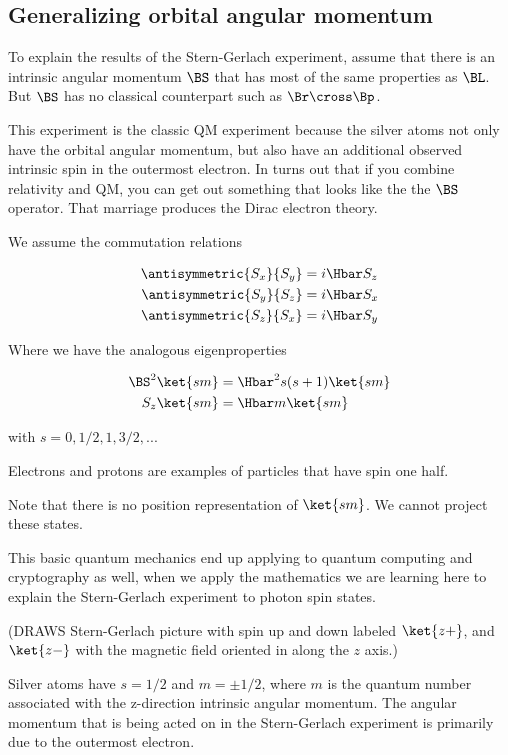 \subsection{Generalizing orbital angular momentum}

To explain the results of the Stern-Gerlach experiment, assume that there is an intrinsic angular momentum $\BS$ that has most of the same properties as $\BL$.  But $\BS$ has no classical counterpart such as $\Br \cross \Bp$.

This experiment is the classic QM experiment because the silver atoms not only have the orbital angular momentum, but also have an additional observed intrinsic spin in the outermost electron.  In turns out that if you combine relativity and QM, you can get out something that looks like the the $\BS$ operator.  That marriage produces the Dirac electron theory.

We assume the commutation relations

\begin{align}\label{eqn:PHY356Foct19:2000}
\antisymmetric{S_x}{S_y} &= i \Hbar S_z \\
\antisymmetric{S_y}{S_z} &= i \Hbar S_x \\
\antisymmetric{S_z}{S_x} &= i \Hbar S_y
\end{align}

Where we have the analogous eigenproperties

\begin{align}\label{eqn:PHY356Foct19:2001}
\BS^2 \ket{sm} &= \Hbar^2 s(s+1) \ket{sm} \\
S_z \ket{sm} &= \Hbar m \ket{sm}
\end{align}

with $s = 0, 1/2, 1, 3/2, ...$

Electrons and protons are examples of particles that have spin one half.

Note that there is no position representation of $\ket{sm}$.  We cannot project these states.

This basic quantum mechanics end up applying to quantum computing and cryptography as well, when we apply the mathematics we are learning here to explain the Stern-Gerlach experiment to photon spin states.

(DRAWS Stern-Gerlach picture with spin up and down labeled $\ket{z+}$, and $\ket{z-}$ with the magnetic field oriented in along the $z$ axis.)

Silver atoms have $s = 1/2$ and $m= \pm 1/2$, where $m$ is the quantum number associated with the z-direction intrinsic angular momentum.  The angular momentum that is being acted on in the Stern-Gerlach experiment is primarily due to the outermost electron.

